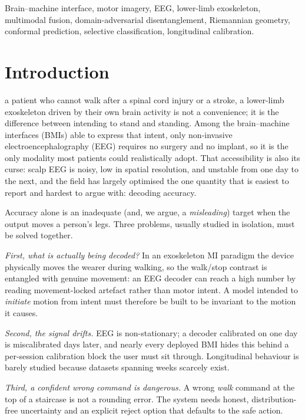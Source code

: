 \documentclass[journal]{IEEEtran}
\begin{document}
\begin{IEEEkeywords}
Brain--machine interface, motor imagery, EEG, lower-limb exoskeleton, multimodal
fusion, domain-adversarial disentanglement, Riemannian geometry, conformal
prediction, selective classification, longitudinal calibration.
\end{IEEEkeywords}

\section{Introduction}
 a patient who cannot walk after a spinal cord injury or a
stroke, a lower-limb exoskeleton driven by their own brain activity is not a
convenience; it is the difference between intending to stand and standing. Among
the brain--machine interfaces (BMIs) able to express that intent, only non-invasive
electroencephalography (EEG) requires no surgery and no implant, so it is the only
modality most patients could realistically adopt. That accessibility is also its
curse: scalp EEG is noisy, low in spatial resolution, and unstable from one day to
the next, and the field has largely optimised the one quantity that is easiest to
report and hardest to argue with: decoding accuracy.

Accuracy alone is an inadequate (and, we argue, a \emph{misleading}) target when
the output moves a person's legs. Three problems, usually studied in isolation, must
be solved together.

\emph{First, what is actually being decoded?} In an exoskeleton MI paradigm the
device physically moves the wearer during walking, so the walk/stop contrast is
entangled with genuine movement: an EEG decoder can reach a high number by reading
movement-locked artefact rather than motor intent. A model intended to
\emph{initiate} motion from intent must therefore be built to be invariant to the
motion it causes.

\emph{Second, the signal drifts.} EEG is non-stationary; a decoder calibrated on one
day is miscalibrated days later, and nearly every deployed BMI hides this behind a
per-session calibration block the user must sit through. Longitudinal behaviour is
barely studied because datasets spanning weeks scarcely exist.

\emph{Third, a confident wrong command is dangerous.} A wrong \emph{walk} command at
the top of a staircase is not a rounding error. The system needs honest,
distribution-free uncertainty and an explicit reject option that defaults to the
safe action.
\end{document}
